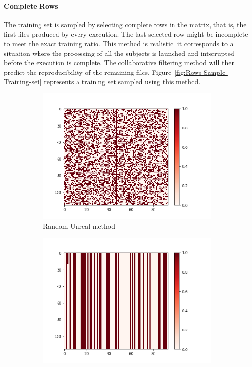 \documentclass[10pt, conference, compsocconf]{IEEEtran}
\begin{document}
\paragraph{Complete Rows} The training set is sampled by selecting complete 
rows in the matrix, that is, the first files produced by
every execution. The last selected row might be incomplete to meet the
exact training ratio. This method is realistic: it corresponds to a 
situation where the processing of all the subjects is launched and 
interrupted before the execution is complete. The collaborative 
filtering method will then predict the reproducibility of the remaining 
files. Figure~\ref{fig:Rows-Sample-Training-set} represents a training 
set sampled using this method.
\begin{figure}[h!]
	\centering
	\begin{subfigure}[b]{0.4\linewidth}
		\includegraphics[width=\columnwidth]{figures/5vs7_random-unreal_04_training}
  		\caption{Random Unreal method}
  		\label{fig:Random-Unreal-Sample-Training-set}
	\end{subfigure}
	\begin{subfigure}[b]{0.4\linewidth}
  		\includegraphics[width=\columnwidth]{figures/5vs7_columns_04_training}

\end{subfigure}
\end{figure}
\end{document}
